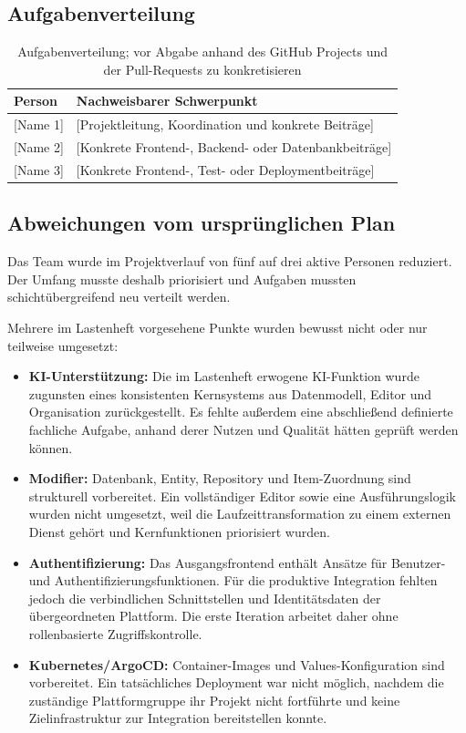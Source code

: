 \documentclass[11pt,a4paper]{article}
\begin{document}
\subsection{Aufgabenverteilung}
\begin{table}[H]\centering
\begin{tabularx}{\linewidth}{|l|Y|}\hline
\textbf{Person}&\textbf{Nachweisbarer Schwerpunkt}\\\hline
{[Name 1]}&[Projektleitung, Koordination und konkrete Beiträge]\\
{[Name 2]}&[Konkrete Frontend-, Backend- oder Datenbankbeiträge]\\
{[Name 3]}&[Konkrete Frontend-, Test- oder Deploymentbeiträge]\\
\hline
\end{tabularx}
\caption{Aufgabenverteilung; vor Abgabe anhand des GitHub Projects und der
Pull-Requests zu konkretisieren}
\end{table}

\subsection{Abweichungen vom ursprünglichen Plan}
Das Team wurde im Projektverlauf von fünf auf drei aktive Personen reduziert.
Der Umfang musste deshalb priorisiert und Aufgaben mussten
schichtübergreifend neu verteilt werden.

Mehrere im Lastenheft vorgesehene Punkte wurden bewusst nicht oder nur
teilweise umgesetzt:
\begin{itemize}
\item \textbf{KI-Unterstützung:} Die im Lastenheft erwogene KI-Funktion wurde
zugunsten eines konsistenten Kernsystems aus Datenmodell, Editor und
Organisation zurückgestellt. Es fehlte außerdem eine abschließend definierte
fachliche Aufgabe, anhand derer Nutzen und Qualität hätten geprüft werden
können.
\item \textbf{Modifier:} Datenbank, Entity, Repository und Item-Zuordnung sind
strukturell vorbereitet. Ein vollständiger Editor sowie eine
Ausführungslogik wurden nicht umgesetzt, weil die Laufzeittransformation zu
einem externen Dienst gehört und Kernfunktionen priorisiert wurden.
\item \textbf{Authentifizierung:} Das Ausgangsfrontend enthält Ansätze für
Benutzer- und Authentifizierungsfunktionen. Für die produktive Integration
fehlten jedoch die verbindlichen Schnittstellen und Identitätsdaten der
übergeordneten Plattform. Die erste Iteration arbeitet daher ohne
rollenbasierte Zugriffskontrolle.
\item \textbf{Kubernetes/ArgoCD:} Container-Images und Values-Konfiguration
sind vorbereitet. Ein tatsächliches Deployment war nicht möglich, nachdem
die zuständige Plattformgruppe ihr Projekt nicht fortführte und keine
Zielinfrastruktur zur Integration bereitstellen konnte.
\end{itemize}
\end{document}
